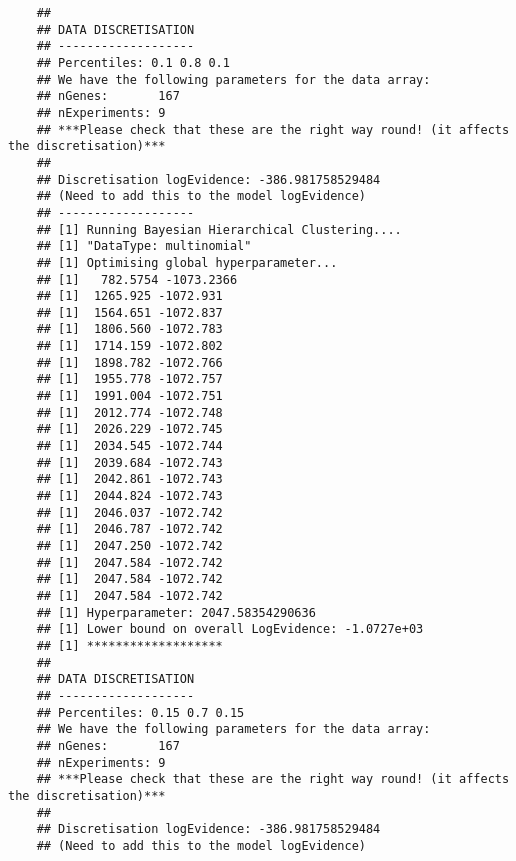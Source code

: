 \begin{Shaded}
\begin{Highlighting}[]
    \NormalTok{(}\NormalTok{(}\NormalTok{,}\NormalTok{))}
    \OtherTok{\textless{}{-}} \NormalTok{, }\NormalTok{)}
    \end{Highlighting}
    \end{Shaded}
    
    \begin{verbatim}
    ## 
    ## DATA DISCRETISATION
    ## -------------------
    ## Percentiles: 0.1 0.8 0.1 
    ## We have the following parameters for the data array:
    ## nGenes:       167
    ## nExperiments: 9
    ## ***Please check that these are the right way round! (it affects the discretisation)***
    ## 
    ## Discretisation logEvidence: -386.981758529484
    ## (Need to add this to the model logEvidence)
    ## -------------------
    ## [1] Running Bayesian Hierarchical Clustering....
    ## [1] "DataType: multinomial"
    ## [1] Optimising global hyperparameter...
    ## [1]   782.5754 -1073.2366
    ## [1]  1265.925 -1072.931
    ## [1]  1564.651 -1072.837
    ## [1]  1806.560 -1072.783
    ## [1]  1714.159 -1072.802
    ## [1]  1898.782 -1072.766
    ## [1]  1955.778 -1072.757
    ## [1]  1991.004 -1072.751
    ## [1]  2012.774 -1072.748
    ## [1]  2026.229 -1072.745
    ## [1]  2034.545 -1072.744
    ## [1]  2039.684 -1072.743
    ## [1]  2042.861 -1072.743
    ## [1]  2044.824 -1072.743
    ## [1]  2046.037 -1072.742
    ## [1]  2046.787 -1072.742
    ## [1]  2047.250 -1072.742
    ## [1]  2047.584 -1072.742
    ## [1]  2047.584 -1072.742
    ## [1]  2047.584 -1072.742
    ## [1] Hyperparameter: 2047.58354290636
    ## [1] Lower bound on overall LogEvidence: -1.0727e+03
    ## [1] *******************
    ## 
    ## DATA DISCRETISATION
    ## -------------------
    ## Percentiles: 0.15 0.7 0.15 
    ## We have the following parameters for the data array:
    ## nGenes:       167
    ## nExperiments: 9
    ## ***Please check that these are the right way round! (it affects the discretisation)***
    ## 
    ## Discretisation logEvidence: -386.981758529484
    ## (Need to add this to the model logEvidence)

\end{verbatim}
